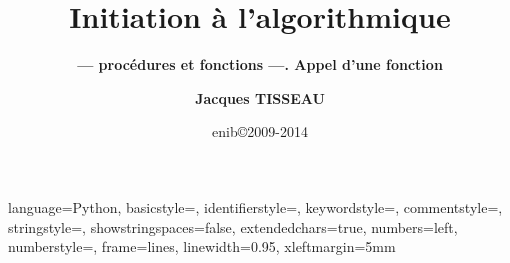 


\newtheorem{rem}{Remarque}[section]
\newtheorem{defin}{Définition}[section]
\newtheorem{td}{\color{blue}TD}[section]

\lstset
{
language=Python,
basicstyle=\ttfamily,
identifierstyle=\ttfamily,
keywordstyle=\color{blue}\ttfamily,
commentstyle=\color{gray}\ttfamily,
stringstyle=\color{green}\ttfamily,
showstringspaces=false,
extendedchars=true,
numbers=left, 
numberstyle=\tiny,
frame=lines,
linewidth=0.95\textwidth,
xleftmargin=5mm
} 

\def\exo#1{\mbox{}\ \hfill\mbox{\color{blue}$\rule{2mm}{2mm}\,$\footnotesize\sc TD\ref{#1}}}
\def\exercice#1#2{\mbox{}\ \ TD \ref{#1}\ #2\ \dotfill\ \pageref{#1}\mbox{}}

\newenvironment{py}[1]{\begin{minipage}[t]{#1}\footnotesize}{\end{minipage}}

\graphicspath{{../../fig/}}

\title[Algorithmique]{\bf Initiation à l'algorithmique}
\subtitle{\bf --- procédures et fonctions ---. Appel d'une fonction}

\author[\tt jacques.tisseau@enib.fr]{\large\bf Jacques TISSEAU}
\institute[\enib]{{\large\enib--\cerv}}
\date[enib\copyright 2009-2014]{\footnotesize enib\copyright 2009-2014}


